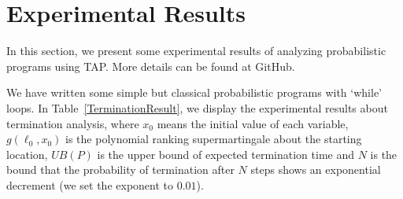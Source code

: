 \documentclass[sigconf,review, anonymous]{acmart}
\begin{document}
\section{Experimental Results}
In this section, we present some experimental results of analyzing probabilistic programs using TAP. More details can be found at GitHub.


We have written some simple but classical probabilistic programs with `while' loops. In Table~\ref{TerminationResult}, we display the experimental results about termination analysis, where $x_0$ means the initial value of each variable, $g(\ell_0,x_0)$ is the polynomial ranking supermartingale about the starting location, $UB(P)$ is the upper bound of expected termination time and $N$ is the bound that the probability of termination after $N$ steps shows an exponential decrement (we set the exponent to  $0.01$).
\end{document}
